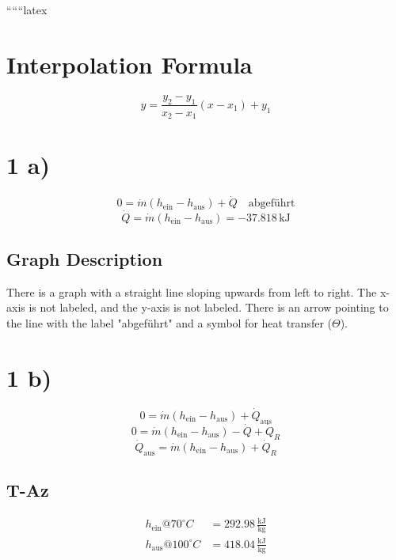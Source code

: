 
``````latex


\section*{Interpolation Formula}
\begin{equation}
y = \frac{y_2 - y_1}{x_2 - x_1} (x - x_1) + y_1
\end{equation}

\section*{1 a)}
\begin{equation}
0 = \dot{m} (h_{\text{ein}} - h_{\text{aus}}) + \dot{Q} \quad \text{abgeführt}
\end{equation}
\begin{equation}
\dot{Q} = \dot{m} (h_{\text{ein}} - h_{\text{aus}}) = -37.818 \, \text{kJ}
\end{equation}

\subsection*{Graph Description}
There is a graph with a straight line sloping upwards from left to right. The x-axis is not labeled, and the y-axis is not labeled. There is an arrow pointing to the line with the label "abgeführt" and a symbol for heat transfer (\(\Theta\)).

\section*{1 b)}
\begin{equation}
0 = \dot{m} (h_{\text{ein}} - h_{\text{aus}}) + \dot{Q}_{\text{aus}}
\end{equation}
\begin{equation}
0 = \dot{m} (h_{\text{ein}} - h_{\text{aus}}) - \dot{Q} + \dot{Q}_R
\end{equation}
\begin{equation}
\dot{Q}_{\text{aus}} = \dot{m} (h_{\text{ein}} - h_{\text{aus}}) + \dot{Q}_R
\end{equation}

\subsection*{T-Az}
\begin{align*}
h_{\text{ein}} @ 70^\circ C &= 292.98 \, \frac{\text{kJ}}{\text{kg}} \\
h_{\text{aus}} @ 100^\circ C &= 418.04 \, \frac{\text{kJ}}{\text{kg}}
\end{align*}

